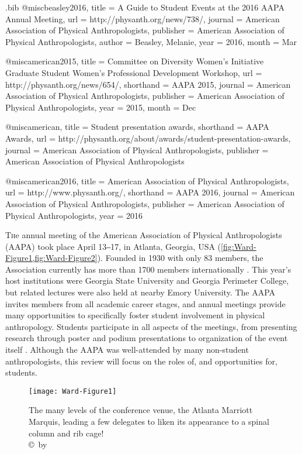\begin{filecontents}{\IJSRAidentifier.bib}
@misc{beasley2016,
title = {A Guide to Student Events at the 2016 AAPA Annual Meeting},
url = {http://physanth.org/news/738/},
journal = {American Association of Physical Anthropologists},
publisher = {American Association of Physical Anthropologists},
author = {Beasley, Melanie},
year = {2016},
month = {Mar}
} 

@misc{american2015,
title = {Committee on Diversity Women's Initiative Graduate Student Women's Professional Development Workshop},
url = {http://physanth.org/news/654/},
shorthand = {AAPA 2015},
journal = {American Association of Physical Anthropologists},
publisher = {American Association of Physical Anthropologists},
year = {2015},
month = {Dec}
}

@misc{american,
title = {Student presentation awards},
shorthand = {AAPA Awards},
url = {http://physanth.org/about/awards/student-presentation-awards},
journal = {American Association of Physical Anthropologists},
publisher = {American Association of Physical Anthropologists}
}

@misc{american2016,
title = {American Association of Physical Anthropologists},
url = {http://www.physanth.org/},
shorthand = {AAPA 2016},
journal = {American Association of Physical Anthropologists},
publisher = {American Association of Physical Anthropologists},
year = {2016}
}
\end{filecontents}

%
\IJSRAopening%


\lettrine{T}he  annual meeting of the American Association of Physical Anthropologists (AAPA)
took place April 13‒17, in Atlanta, Georgia, USA (\cref{fig:Ward-Figure1,fig:Ward-Figure2}).
Founded in 1930 with only \num{83} members, the Association currently has more than \num{1700} members internationally \parencite{american2016}.
This year’s host institutions were Georgia State University and Georgia Perimeter College,
but related lectures were also held at nearby Emory University.
The AAPA invites members from all academic career stages, and annual meetings provide many opportunities to
specifically foster student involvement in physical anthropology.
Students participate in all aspects of the meetings, from presenting research through poster and
podium presentations to organization of the event itself \parencite{beasley2016}.
Although the AAPA was well-attended by many non-student anthropologists, this review will focus on the roles of,
and opportunities for, students.
\begin{figure}[!htb] %
		\centering
		\texttt{[image: Ward-Figure1]}
		\caption{The many levels of the conference venue, the Atlanta Marriott Marquis, leading a few delegates to liken its appearance to a spinal column and rib cage! 
		{\normalfont\scriptsize \\ \copyright\ by \authortwo}}
		\label{fig:Ward-Figure1}
	\end{figure}

